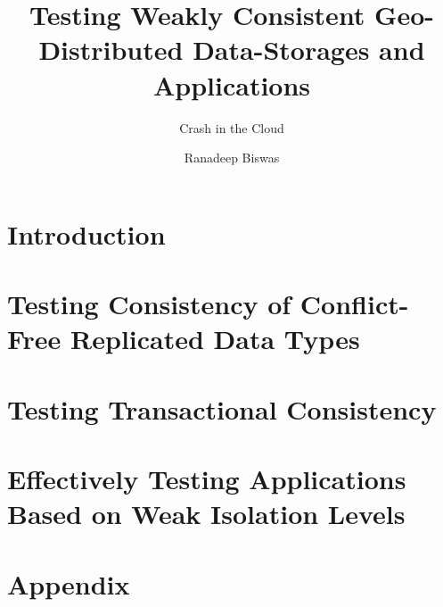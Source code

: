 \documentclass{mimosis}
\title{Testing Weakly Consistent Geo-Distributed Data-Storages and Applications}
\subtitle{Crash in the Cloud}
\author{Ranadeep Biswas}
\begin{document}
\frontmatter
  
  

  

  \tableofcontents

\mainmatter

  \chapter{Introduction}

  

  \chapter{Testing Consistency of Conflict-Free Replicated Data Types}

  
  
  
  
  
  
  
  

  \chapter{Testing Transactional Consistency}
  
  
  
  
  
  

  \chapter{Effectively Testing Applications Based on Weak Isolation Levels}

  
  
  
  
  
  
  
  
  
  

  \chapter{Appendix}

  

\backmatter

  \begingroup
    \let\clearpage\relax
    \glsaddall
    \printglossary[type=\acronymtype]
    \newpage
    \printglossary
  \endgroup

  \printindex
  \printbibliography
\end{document}
